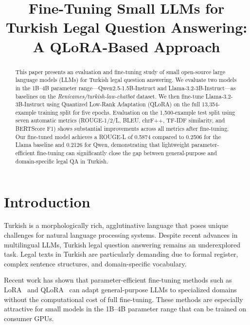 \documentclass[conference]{IEEEtran}
\begin{document}
\title{Fine-Tuning Small LLMs for Turkish Legal Question Answering:\\
A QLoRA-Based Approach}

\author{
}

\maketitle

\begin{abstract}
This paper presents an evaluation and fine-tuning study of small open-source large language
models (LLMs) for Turkish legal question answering. We evaluate two models in the 1B--4B
parameter range---Qwen2.5-1.5B-Instruct and Llama-3.2-3B-Instruct---as baselines on the
\textit{Renicames/turkish-law-chatbot} dataset. We then fine-tune Llama-3.2-3B-Instruct
using Quantized Low-Rank Adaptation (QLoRA) on the full 13,354-example training split
for five epochs. Evaluation on the 1,500-example test split using seven automatic metrics
(ROUGE-1/2/L, BLEU, chrF++, TF-IDF similarity, and BERTScore F1) shows substantial
improvements across all metrics after fine-tuning. Our fine-tuned model achieves a ROUGE-L
of 0.5874 compared to 0.2506 for the Llama baseline and 0.2126 for Qwen, demonstrating that
lightweight parameter-efficient fine-tuning can significantly close the gap between
general-purpose and domain-specific legal QA in Turkish.
\end{abstract}

\section{Introduction}

Turkish is a morphologically rich, agglutinative language that poses unique challenges for
natural language processing systems. Despite recent advances in multilingual LLMs, Turkish
legal question answering remains an underexplored task. Legal texts in Turkish are
particularly demanding due to formal register, complex sentence structures, and
domain-specific vocabulary.

Recent work has shown that parameter-efficient fine-tuning methods such as
LoRA~\cite{hu2022lora} and QLoRA~\cite{dettmers2023qlora} can adapt general-purpose LLMs to
specialized domains without the computational cost of full fine-tuning. These methods are
especially attractive for small models in the 1B--4B parameter range that can be trained
on consumer GPUs.
\end{document}
